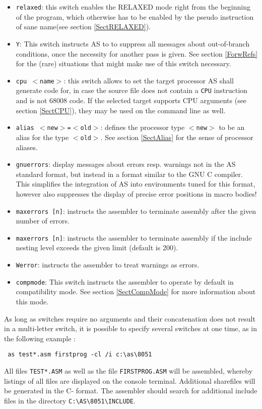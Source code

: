 \documentclass[12pt,twoside]{report}
\newcommand{\tty}[1]{{\tt #1}}
\begin{document}
\begin{itemize}
{      the first pass.  Be prepared for a bunch of messages!!}
\item{\tty{relaxed}: this switch enables the RELAXED mode right from the
      beginning of the program, which otherwise has to be enabled by the
      pseudo instruction of sane name(see section \ref{SectRELAXED}).}
\item{\tty{Y}: This switch instructs AS to to suppress all messages about
      out-of-branch conditions, once the necessity for another pass is given.
      See section \ref{ForwRefs} for the (rare) situations that might make
      use of this switch necessary.}
\item{\tty{cpu $<$name$>$}: this switch allows to set the target processor
      AS shall generate code for, in case the source file does not contain
      a {\tt CPU} instruction and is not 68008 code.  If the selected target
      supports CPU arguments (see section \ref{SectCPU}), they may be used
      on the command line as well.}
\item{\tty{alias $<$new$>$=$<$old$>$}:
      defines the processor type \tty{$<$new$>$} to be an alias for the
      type \tty{$<$old$>$}.  See section \ref{SectAlias} for the sense of
      processor aliases.}
\item{{\tt gnuerrors}: display messages about errors resp. warnings not
      in the AS standard format, but instead in a format similar to the
      GNU C compiler.  This simplifies the integration of AS into
      environments tuned for this format, however also suppresses the
      display of precise error positions in macro bodies!}
\item{{\tt maxerrors [n]}: instructs the assembler to terminate
      assembly after the given number of errors.}
\item{{\tt maxerrors [n]}: instructs the assembler to terminate
      assembly if the include nesting level exceeds the given limit
      (default is 200).}
\item{{\tt Werror}: instructs the assembler to treat warnings as errors.}
\item{\tty{compmode}: This switch instructs the assembler to operate by
      default in compatibility mode.  See section \ref{SectCompMode} for
      more information about this mode.}
\end{itemize}
As long as switches require no arguments and their concatenation does
not result in a multi-letter switch, it is possible to specify several
switches at one time, as in the following example :
\begin{verbatim}
 as test*.asm firstprog -cl /i c:\as\8051
\end{verbatim}
All files \tty{TEST*.ASM} as well as the file \tty{FIRSTPROG.ASM} will be
assembled, whereby listings of all files are displayed on the
console terminal.  Additional sharefiles will be generated in the C-
format.  The assembler should search for additional include files
in the directory \verb!C:\AS\8051\INCLUDE!.
\end{document}
